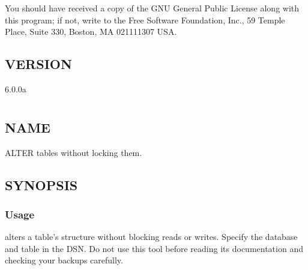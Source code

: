\documentclass[letterpaper,10pt,english]{sphinxmanual}
\begin{document}
\sphinxAtStartPar
You should have received a copy of the GNU General Public License along with
this program; if not, write to the Free Software Foundation, Inc., 59 Temple
Place, Suite 330, Boston, MA  02111\sphinxhyphen{}1307  USA.


\section{VERSION}
\label{\detokenize{mariadb-query-digest:version}}
\sphinxAtStartPar
{} 6.0.0a


\chapter{}
\label{\detokenize{mariadb-schema-change:mariadb-schema-change}}\label{\detokenize{mariadb-schema-change::doc}}

\section{NAME}
\label{\detokenize{mariadb-schema-change:name}}
\sphinxAtStartPar
{} \sphinxhyphen{} ALTER tables without locking them.


\section{SYNOPSIS}
\label{\detokenize{mariadb-schema-change:synopsis}}

\subsection{Usage}
\label{\detokenize{mariadb-schema-change:usage}}
\begin{sphinxVerbatim}[commandchars=\\\{\}]
 \PYG{p}{[}\PYG{p}{]} 
\end{sphinxVerbatim}

\sphinxAtStartPar
{} alters a table’s structure without blocking reads or
writes.  Specify the database and table in the DSN. Do not use this tool before
reading its documentation and checking your backups carefully.
\end{document}
